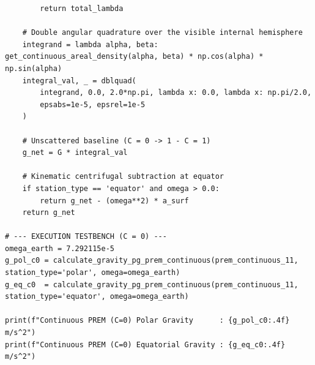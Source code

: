 \begin{lstlisting}
        return total_lambda

    # Double angular quadrature over the visible internal hemisphere
    integrand = lambda alpha, beta: get_continuous_areal_density(alpha, beta) * np.cos(alpha) * np.sin(alpha)
    integral_val, _ = dblquad(
        integrand, 0.0, 2.0*np.pi, lambda x: 0.0, lambda x: np.pi/2.0,
        epsabs=1e-5, epsrel=1e-5
    )
    
    # Unscattered baseline (C = 0 -> 1 - C = 1)
    g_net = G * integral_val
    
    # Kinematic centrifugal subtraction at equator
    if station_type == 'equator' and omega > 0.0:
        return g_net - (omega**2) * a_surf
    return g_net

# --- EXECUTION TESTBENCH (C = 0) ---
omega_earth = 7.292115e-5
g_pol_c0 = calculate_gravity_pg_prem_continuous(prem_continuous_11, station_type='polar', omega=omega_earth)
g_eq_c0  = calculate_gravity_pg_prem_continuous(prem_continuous_11, station_type='equator', omega=omega_earth)

print(f"Continuous PREM (C=0) Polar Gravity      : {g_pol_c0:.4f} m/s^2")
print(f"Continuous PREM (C=0) Equatorial Gravity : {g_eq_c0:.4f} m/s^2")
\end{lstlisting}
%
